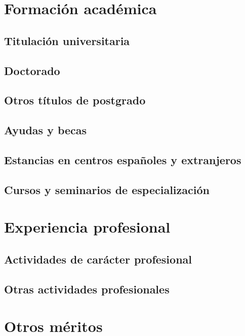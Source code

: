 \documentclass[14pt, article, twoside, a4paper]{memoir}
\begin{document}
\part{Formación académica}

\cleardoublepage 
\chapter{Titulación universitaria}
\cleardoublepage 


\cleardoublepage 
\chapter{Doctorado}
\cleardoublepage 


\cleardoublepage 
\chapter{Otros títulos de postgrado}
\cleardoublepage 


\cleardoublepage 
\chapter{Ayudas y becas}
\cleardoublepage 

\cleardoublepage 
\chapter{Estancias en centros españoles y extranjeros}
\cleardoublepage 


\cleardoublepage 
\chapter{Cursos y seminarios de especialización}
\cleardoublepage 


\part{Experiencia profesional}
\cleardoublepage 

\cleardoublepage 
\chapter{Actividades de carácter profesional}
\cleardoublepage 


\cleardoublepage 
\chapter{Otras actividades profesionales}
\cleardoublepage 


\part{Otros méritos}
\cleardoublepage 

\end{document}
